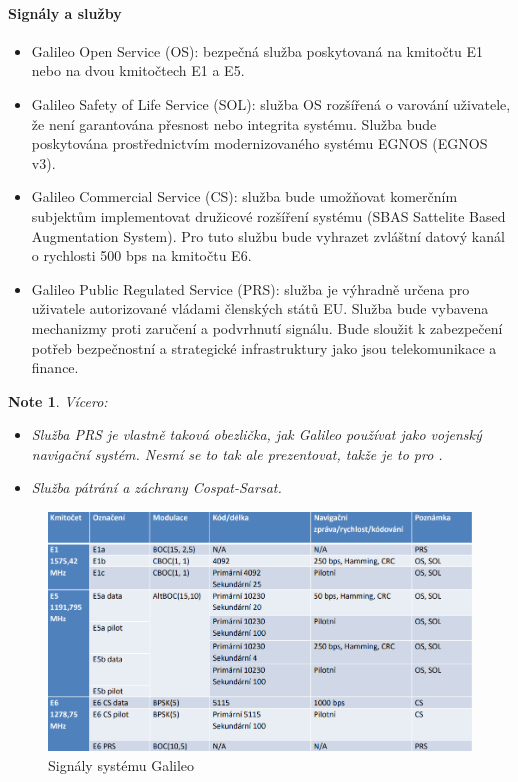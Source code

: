 \documentclass[11pt,a4paper]{article}
\theoremstyle{my-theorem}
\theoremstyle{non-theorem}
\newtheorem{note}[theorem]{Note}
\begin{document}
\paragraph*{Signály a služby}
\begin{itemize}
    \item Galileo Open Service (OS): bezpečná služba poskytovaná na kmitočtu E1 nebo na dvou kmitočtech E1 a E5.
    \item Galileo Safety of Life Service (SOL): služba OS rozšířená o varování uživatele, že není garantována přesnost nebo integrita systému. Služba bude poskytována prostřednictvím modernizovaného systému EGNOS (EGNOS v3).
    \item Galileo Commercial Service (CS): služba bude umožňovat komerčním subjektům implementovat družicové rozšíření systému (SBAS Sattelite Based Augmentation System). Pro tuto službu bude vyhrazet zvláštní datový kanál o rychlosti 500 bps na kmitočtu E6.
    \item Galileo Public Regulated Service (PRS): služba je výhradně určena pro uživatele autorizované vládami členských států EU. Služba bude vybavena mechanizmy proti zaručení a podvrhnutí signálu. Bude sloužit k zabezpečení potřeb bezpečnostní a strategické infrastruktury jako jsou telekomunikace a finance.
\end{itemize}
\begin{note} Vícero:
    \begin{itemize}
        \item Služba PRS je vlastně taková obezlička, jak Galileo používat jako vojenský navigační systém. Nesmí se to tak ale prezentovat, takže je to pro .
        \item Služba pátrání a záchrany Cospat-Sarsat.
    \end{itemize}
\end{note}
\begin{figure}[!ht]
    \begin{center}
        \includegraphics[width=\textwidth]{src/galileo-signals.png}
    \end{center}
    \label{fig:galileo-signals}
    \caption{Signály systému Galileo}
\end{figure}
\end{document}
